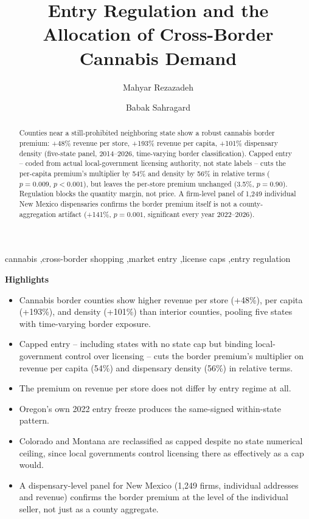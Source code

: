 \documentclass[5p]{elsarticle}
\begin{document}
\begin{frontmatter}

\title{Entry Regulation and the Allocation of Cross-Border Cannabis Demand}

\author[1]{Mahyar Rezazadeh}
\author[1]{Babak Sahragard}
\address[1]{Department of Economics}

\begin{abstract}
Counties near a still-prohibited neighboring state show a robust cannabis border premium: +48\% revenue per
store, +193\% revenue per capita, +101\% dispensary density (five-state panel, 2014--2026, time-varying border
classification). Capped entry -- coded from actual local-government licensing authority, not state labels --
cuts the per-capita premium's multiplier by 54\% and density by 56\% in relative terms ($p{=}0.009$,
$p{<}0.001$), but leaves the
per-store premium unchanged (3.5\%, $p{=}0.90$). Regulation blocks the quantity margin, not price. A firm-level
panel of 1{,}249 individual New Mexico dispensaries confirms the border premium itself is not a
county-aggregation artifact (+141\%, $p{=}0.001$, significant every year 2022--2026).
\end{abstract}

\begin{keyword}
cannabis \sep cross-border shopping \sep market entry \sep license caps \sep entry regulation
\end{keyword}

\end{frontmatter}

\noindent\textbf{Highlights}
\begin{itemize}
\item Cannabis border counties show higher revenue per store (+48\%), per capita (+193\%), and density
(+101\%) than interior counties, pooling five states with time-varying border exposure.
\item Capped entry -- including states with no state cap but binding local-government control over licensing
-- cuts the border premium's multiplier on revenue per capita (54\%) and dispensary density (56\%) in relative terms.
\item The premium on revenue per store does not differ by entry regime at all.
\item Oregon's own 2022 entry freeze produces the same-signed within-state pattern.
\item Colorado and Montana are reclassified as capped despite no state numerical ceiling, since local
governments control licensing there as effectively as a cap would.
\item A dispensary-level panel for New Mexico (1{,}249 firms, individual addresses and revenue) confirms the
border premium at the level of the individual seller, not just as a county aggregate.
\end{itemize}
\end{document}
